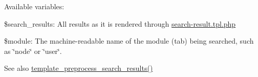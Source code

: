 Available variables:
\begin{DoxyItemize}
\item \$search\_\-results: All results as it is rendered through \hyperlink{search-result_8tpl_8php}{search-\/result.tpl.php}
\item \$module: The machine-\/readable name of the module (tab) being searched, such as \char`\"{}node\char`\"{} or \char`\"{}user\char`\"{}.
\end{DoxyItemize}

\begin{DoxySeeAlso}{See also}
\hyperlink{search_8pages_8inc_aa0012b762375491296b1248124a177e9}{template\_\-preprocess\_\-search\_\-results()} 
\end{DoxySeeAlso}
